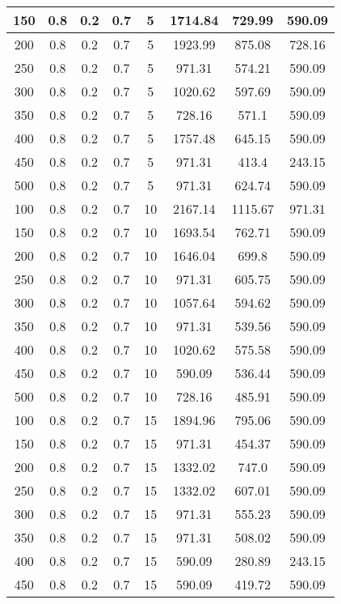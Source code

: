 \documentclass[a4paper, 12pt]{extreport}
\begin{document}
\begin{itemize}
\begin{longtable}{|c|c|c|c|c|c|c|c|}
			150 & 0.8 & 0.2 & 0.7 & 5 & 1714.84 & 729.99 & 590.09 \\\hline
			200 & 0.8 & 0.2 & 0.7 & 5 & 1923.99 & 875.08 & 728.16 \\\hline
			250 & 0.8 & 0.2 & 0.7 & 5 & 971.31 & 574.21 & 590.09 \\\hline
			300 & 0.8 & 0.2 & 0.7 & 5 & 1020.62 & 597.69 & 590.09 \\\hline
			350 & 0.8 & 0.2 & 0.7 & 5 & 728.16 & 571.1 & 590.09 \\\hline
			400 & 0.8 & 0.2 & 0.7 & 5 & 1757.48 & 645.15 & 590.09 \\\hline
			450 & 0.8 & 0.2 & 0.7 & 5 & 971.31 & 413.4 & 243.15 \\\hline
			500 & 0.8 & 0.2 & 0.7 & 5 & 971.31 & 624.74 & 590.09 \\\hline
			100 & 0.8 & 0.2 & 0.7 & 10 & 2167.14 & 1115.67 & 971.31 \\\hline
			150 & 0.8 & 0.2 & 0.7 & 10 & 1693.54 & 762.71 & 590.09 \\\hline
			200 & 0.8 & 0.2 & 0.7 & 10 & 1646.04 & 699.8 & 590.09 \\\hline
			250 & 0.8 & 0.2 & 0.7 & 10 & 971.31 & 605.75 & 590.09 \\\hline
			300 & 0.8 & 0.2 & 0.7 & 10 & 1057.64 & 594.62 & 590.09 \\\hline
			350 & 0.8 & 0.2 & 0.7 & 10 & 971.31 & 539.56 & 590.09 \\\hline
			400 & 0.8 & 0.2 & 0.7 & 10 & 1020.62 & 575.58 & 590.09 \\\hline
			450 & 0.8 & 0.2 & 0.7 & 10 & 590.09 & 536.44 & 590.09 \\\hline
			500 & 0.8 & 0.2 & 0.7 & 10 & 728.16 & 485.91 & 590.09 \\\hline
			100 & 0.8 & 0.2 & 0.7 & 15 & 1894.96 & 795.06 & 590.09 \\\hline
			150 & 0.8 & 0.2 & 0.7 & 15 & 971.31 & 454.37 & 590.09 \\\hline
			200 & 0.8 & 0.2 & 0.7 & 15 & 1332.02 & 747.0 & 590.09 \\\hline
			250 & 0.8 & 0.2 & 0.7 & 15 & 1332.02 & 607.01 & 590.09 \\\hline
			300 & 0.8 & 0.2 & 0.7 & 15 & 971.31 & 555.23 & 590.09 \\\hline
			350 & 0.8 & 0.2 & 0.7 & 15 & 971.31 & 508.02 & 590.09 \\\hline
			400 & 0.8 & 0.2 & 0.7 & 15 & 590.09 & 280.89 & 243.15 \\\hline
			450 & 0.8 & 0.2 & 0.7 & 15 & 590.09 & 419.72 & 590.09 \\\hline

\end{longtable}
\end{itemize}
\end{document}
